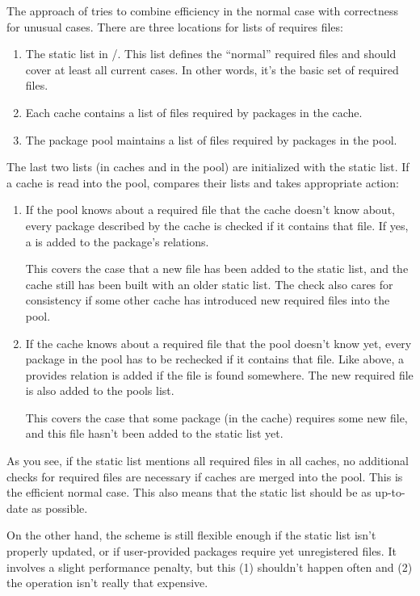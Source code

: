 \documentclass[10pt]{article}
\begin{document}
The approach of  tries to combine efficiency in the
normal case with correctness for unusual cases. There are three
locations for lists of requires files:
\begin{enumerate}
\item
  The static list in \PKGDBULIBPATH\slash\REQFILESFILENAME. This
  list defines the ``normal'' required files and should cover at least
  all current cases. In other words, it's the basic set of required
  files.
\item
  Each cache contains a list of files required by packages in the
  cache.
\item
  The package pool maintains a list of files required by packages
  in the pool.
\end{enumerate}
The last two lists (in caches and in the pool) are initialized with
the static list. If a cache is read into the pool, 
compares their lists and takes appropriate action:
\begin{enumerate}
\item
  If the pool knows about a required file that the cache doesn't know
  about, every package described by the cache is checked if it
  contains that file. If yes, a  is
  added to the package's relations.

  This covers the case that a new file has been added to the static
  list, and the cache still has been built with an older static list.
  The check also cares for consistency if some other cache has
  introduced new required files into the pool.

\item
  If the cache knows about a required file that the pool doesn't know
  yet, every package in the pool has to be rechecked if it contains
  that file. Like above, a provides relation is added if the file is
  found somewhere. The new required file is also added to the pools
  list.

  This covers the case that some package (in the cache) requires some
  new file, and this file hasn't been added to the static list yet.
\end{enumerate}

As you see, if the static list mentions all required files in all
caches, no additional checks for required files are necessary if
caches are merged into the pool. This is the efficient normal case.
This also means that the static list should be as up-to-date as
possible.

On the other hand, the scheme is still flexible enough if the static
list isn't properly updated, or if user-provided packages require yet
unregistered files. It involves a slight performance penalty, but this
(1) shouldn't happen often and (2) the operation isn't really that
expensive.
\end{document}
